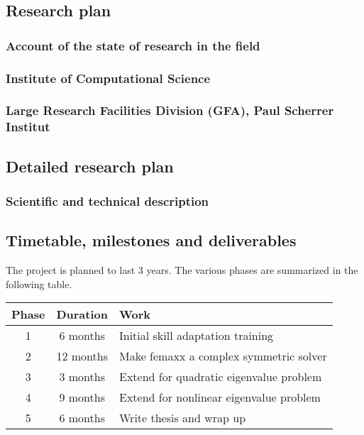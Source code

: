 \documentclass[11pt,a4paper]{article}
\begin{document}
\subsection{Research plan}
\label{sec:research_plan}

\subsubsection{Account of the state of research in the field}
\subsubsection*{Institute of Computational Science}
\subsubsection*{Large Research Facilities Division (GFA), Paul Scherrer
  Institut}


\subsection{Detailed research plan}

\subsubsection*{Scientific and technical description}


\subsection{Timetable, milestones and deliverables}

The project is planned to last 3 years.  The various phases are
summarized in the following table.
\begin{center}
  \begin{tabular}{|c|c|l|}
    \hline
    Phase & Duration & Work \\  \hline
    1 & 6 months &  Initial skill adaptation training \\
    2 & 12 months & Make \textsf{femaxx} a complex symmetric solver \\
    3 & 3 months & Extend for quadratic eigenvalue problem \\
    4 & 9 months & Extend for nonlinear eigenvalue problem \\
    5 & 6 months & Write thesis and wrap up \\  \hline
  \end{tabular}
\end{center}
\end{document}
